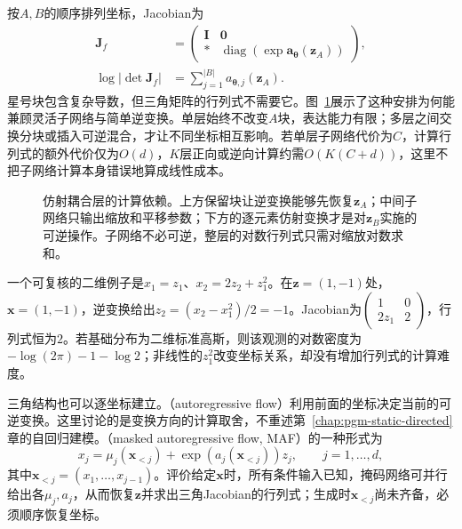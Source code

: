 按$A,B$的顺序排列坐标，Jacobian为
\begin{equation}
  \label{eq:pgm-generative-coupling-jacobian}
  \begin{aligned}
    \bm{J}_{f}
      &=
        \begin{pmatrix}
          \bm{I}&\bm{0}\\
          *&\operatorname{diag}(\exp\bm{a}_{\bm{\theta}}(\bm{z}_A))
        \end{pmatrix},\\
    \log|\det\bm{J}_{f}|
      &=\sum_{j=1}^{|B|}a_{\bm{\theta},j}(\bm{z}_A).
  \end{aligned}
\end{equation}
星号块包含复杂导数，但三角矩阵的行列式不需要它。图~\ref{fig:pgm-generative-coupling}展示了这种安排为何能兼顾灵活子网络与简单逆变换。单层始终不改变$A$块，表达能力有限；多层之间交换分块或插入可逆混合，才让不同坐标相互影响。若单层子网络代价为$C$，计算行列式的额外代价仅为$O(d)$，$K$层正向或逆向计算约需$O(K(C+d))$，这里不把子网络计算本身错误地算成线性成本。

\begin{figure}[htbp]
  \centering
  
  \caption{仿射耦合层的计算依赖。上方保留块让逆变换能够先恢复$\bm{z}_A$；中间子网络只输出缩放和平移参数；下方的逐元素仿射变换才是对$\bm{z}_B$实施的可逆操作。子网络不必可逆，整层的对数行列式只需对缩放对数求和。}
  \label{fig:pgm-generative-coupling}
\end{figure}

一个可复核的二维例子是$x_1=z_1$、$x_2=2z_2+z_1^2$。在$\bm{z}=(1,-1)$处，$\bm{x}=(1,-1)$，逆变换给出$z_2=(x_2-x_1^2)/2=-1$。Jacobian为$\left(\begin{smallmatrix}1&0\\2z_1&2\end{smallmatrix}\right)$，行列式恒为$2$。若基础分布为二维标准高斯，则该观测的对数密度为$-\log(2\pi)-1-\log2$；非线性的$z_1^2$改变坐标关系，却没有增加行列式的计算难度。

三角结构也可以逐坐标建立。（autoregressive flow）利用前面的坐标决定当前的可逆变换。这里讨论的是变换方向的计算取舍，不重述第~\ref{chap:pgm-static-directed}章的自回归建模。（masked autoregressive flow, MAF）的一种形式为
\[
  x_j=\mu_j(\bm{x}_{<j})+
       \exp(a_j(\bm{x}_{<j}))z_j,\qquad j=1,\ldots,d,
\]
其中$\bm{x}_{<j}=(x_1,\ldots,x_{j-1})$。评价给定$\bm{x}$时，所有条件输入已知，掩码网络可并行给出各$\mu_j,a_j$，从而恢复$\bm{z}$并求出三角Jacobian的行列式；生成时$\bm{x}_{<j}$尚未齐备，必须顺序恢复坐标。

